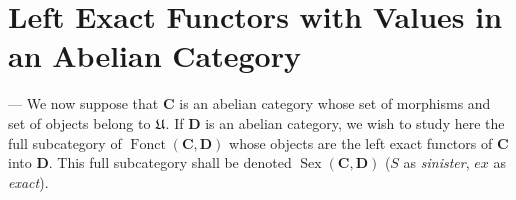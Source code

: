 %

\section{Left Exact Functors with Values in an Abelian Category}
--- We now suppose that $\mathbf{C}$ is an abelian category whose set of
morphisms and set of objects belong to $\mathfrak{U}$. If $\mathbf{D}$ is an
abelian category, we wish to study here the full subcategory of
$\operatorname{Fonct}(\mathbf{C},\mathbf{D})$ whose objects are the left
exact functors of $\mathbf{C}$ into $\mathbf{D}$. This full subcategory shall
be denoted $\operatorname{Sex}(\mathbf{C},\mathbf{D})$ ($S$ as
\emph{sinister}, $ex$ as \emph{exact}).

